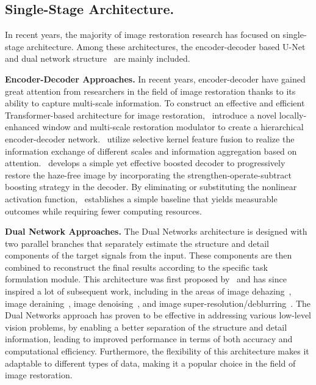 \documentclass[sn-mathphys,Numbered]{sn-jnl}
\theoremstyle{thmstyleone}\newtheorem{theorem}{Theorem}\newtheorem{proposition}[theorem]{Proposition}
\theoremstyle{thmstyletwo}\newtheorem{example}{Example}\newtheorem{remark}{Remark}
\theoremstyle{thmstylethree}\newtheorem{definition}{Definition}
\begin{document}
\subsection{Single-Stage Architecture.}
In recent years, the majority of image restoration research has focused on single-stage architecture. Among these architectures, the encoder-decoder based U-Net~\cite{chen2022simple, chu2022nafssr, Wang_2022_CVPR,2021Rethinking,deganv2,Zamir2021MPRNet,r90ECCV2020_984,r99Zhang2020PlugandPlayIR}  and dual network structure~\cite{2018DehazeGAN,2019Dense,2019Dual,tian2021designing,2020Refining} are mainly included.

\textbf{Encoder-Decoder Approaches.} In recent years, encoder-decoder have gained great attention from researchers in the field of image restoration thanks to its ability to capture multi-scale information. To construct an effective and efficient Transformer-based architecture for image restoration,~\cite{Wang_2022_CVPR} introduce a novel locally-enhanced window and multi-scale restoration modulator to create a hierarchical encoder-decoder network.~\cite{Zamir2022MIRNetv2} utilize selective kernel feature fusion to realize the information exchange of different scales and information aggregation based on attention.~\cite{9156921} develops a simple yet effective boosted decoder to progressively restore the haze-free image by incorporating the strengthen-operate-subtract boosting strategy in the decoder.  By eliminating or substituting the nonlinear activation function,~\cite{chen2022simple} establishes a simple baseline that yields measurable outcomes while requiring fewer computing resources. 

\textbf{Dual Network Approaches.} The Dual Networks architecture is designed with two parallel branches that separately estimate the structure and detail components of the target signals from the input. These components are then combined to reconstruct the final results according to the specific task formulation module. This architecture was first proposed by~\cite{2018LearningD} and has since inspired a lot of subsequent work, including in the areas of image dehazing~\cite{2018DehazeGAN,2019Dense,2019Dual}, image deraining~\cite{2018Fast}, image denoising~\cite{tian2021designing}, and image super-resolution/deblurring~\cite{2020Refining}. The Dual Networks approach has proven to be effective in addressing various low-level vision problems, by enabling a better separation of the structure and detail information, leading to improved performance in terms of both accuracy and computational efficiency. Furthermore, the flexibility of this architecture makes it adaptable to different types of data, making it a popular choice in the field of image restoration.
\end{document}
